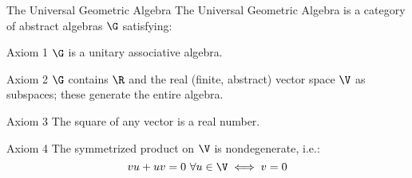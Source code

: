 \begin{definition}{The Universal Geometric Algebra}
	The Universal Geometric Algebra is a category of abstract algebras $\G$ satisfying:
	\begin{block}{Axiom 1}
	    $\G$ is a unitary associative algebra.
	\end{block}
	\begin{block}{Axiom 2}
	    $\G$ contains $\R$ and the real (finite, abstract) vector space $\V$ as subspaces; these generate the entire algebra.
	\end{block}
	\begin{block}{Axiom 3}
	    The square of any vector is a real number.
	\end{block}
	\begin{block}{Axiom 4}
	    The symmetrized product on $\V$ is nondegenerate, i.e.:
	    \[vu + uv = 0 \ \forall u \in \V \iff v = 0\]
	\end{block}
\end{definition}
